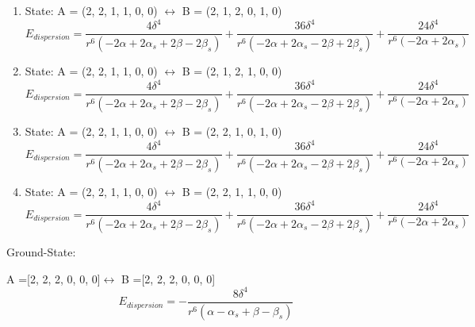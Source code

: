 \documentclass[12pt,a4paper]{article}
\begin{document}
\begin{enumerate}
 \item State: A = (2, 2, 1, 1, 0, 0) $\leftrightarrow$ B = (2, 1, 2, 0, 1, 0) 
$$E_{dispersion} =\frac{4 \delta^{4}}{r^{6} \left(- 2 \alpha + 2 \alpha_{s} + 2 \beta - 2 \beta_{s}\right)} + \frac{36 \delta^{4}}{r^{6} \left(- 2 \alpha + 2 \alpha_{s} - 2 \beta + 2 \beta_{s}\right)} + \frac{24 \delta^{4}}{r^{6} \left(- 2 \alpha + 2 \alpha_{s}\right)}$$
 \item State: A = (2, 2, 1, 1, 0, 0) $\leftrightarrow$ B = (2, 1, 2, 1, 0, 0) 
$$E_{dispersion} =\frac{4 \delta^{4}}{r^{6} \left(- 2 \alpha + 2 \alpha_{s} + 2 \beta - 2 \beta_{s}\right)} + \frac{36 \delta^{4}}{r^{6} \left(- 2 \alpha + 2 \alpha_{s} - 2 \beta + 2 \beta_{s}\right)} + \frac{24 \delta^{4}}{r^{6} \left(- 2 \alpha + 2 \alpha_{s}\right)}$$
 \item State: A = (2, 2, 1, 1, 0, 0) $\leftrightarrow$ B = (2, 2, 1, 0, 1, 0) 
$$E_{dispersion} =\frac{4 \delta^{4}}{r^{6} \left(- 2 \alpha + 2 \alpha_{s} + 2 \beta - 2 \beta_{s}\right)} + \frac{36 \delta^{4}}{r^{6} \left(- 2 \alpha + 2 \alpha_{s} - 2 \beta + 2 \beta_{s}\right)} + \frac{24 \delta^{4}}{r^{6} \left(- 2 \alpha + 2 \alpha_{s}\right)}$$
 \item State: A = (2, 2, 1, 1, 0, 0) $\leftrightarrow$ B = (2, 2, 1, 1, 0, 0) 
$$E_{dispersion} =\frac{4 \delta^{4}}{r^{6} \left(- 2 \alpha + 2 \alpha_{s} + 2 \beta - 2 \beta_{s}\right)} + \frac{36 \delta^{4}}{r^{6} \left(- 2 \alpha + 2 \alpha_{s} - 2 \beta + 2 \beta_{s}\right)} + \frac{24 \delta^{4}}{r^{6} \left(- 2 \alpha + 2 \alpha_{s}\right)}$$
\end{enumerate}
Ground-State:

A =[2, 2, 2, 0, 0, 0]$\leftrightarrow$ B =[2, 2, 2, 0, 0, 0]
$$E_{dispersion} =- \frac{8 \delta^{4}}{r^{6} \left(\alpha - \alpha_{s} + \beta - \beta_{s}\right)}$$
\end{document}
